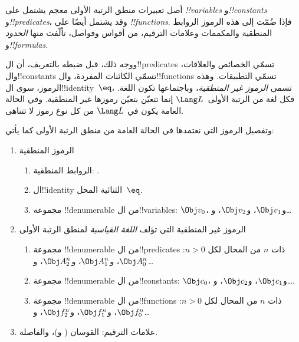 \documentclass[../../../include/open-logic-section]{subfiles}
\begin{document}



أصل تعبيرات منطق الرتبة الأولى معجم يشتمل على
\emph{!!{variable}s} و\emph{!!{constant}s} و\emph{!!{predicate}s}،
وقد يشتمل أيضًا على \emph{!!{function}s}. فإذا ضُمّت إلى هذه الرموز
الروابط المنطقية والمكممات وعلامات الترقيم، من أقواس وفواصل، تألّفت
منها \emph{الحدود} و\emph{!!{formula}s}.

\begin{explain}
ووجه ذلك، قبل ضبطه بالتعريف، أن ال!!{predicate}s تسمّي الخصائص
والعلاقات، وال!!{constant}s تسمّي الكائنات المفردة، وال!!{function}s
تسمّي التطبيقات. وهذه الرموز، سوى ال!!{identity}~$\eq$، تسمى
\emph{الرموز غير المنطقية}، وباجتماعها تكون اللغة. فكل لغة من
الرتبة الأولى~$\Lang L$ إنما تتعيّن بتعيّن رموزها غير المنطقية.
وفي الحالة العامة يكون في $\Lang L$ من كل نوع رموز لا تتناهى.
\end{explain}

وتفصيل الرموز التي نعتمدها في الحالة العامة من منطق الرتبة الأولى كما يأتي:

\begin{enumerate}
\item الرموز المنطقية
\begin{enumerate}
\item الروابط المنطقية:
  \startycommalist
  .
\item ال!!{identity} الثنائية المحل~$\eq$.
\item مجموعة !!{denumerable} من ال!!{variable}s: $\Obj v_0$، و$\Obj v_1$، و$\Obj
  v_2$، و\dots
\end{enumerate}
\item الرموز غير المنطقية التي تؤلف \emph{اللغة القياسية} لمنطق
  الرتبة الأولى
\begin{enumerate}
\item مجموعة !!{denumerable} من ال!!{predicate}s ذات $n$ من المحال لكل
  $n>0$: $\Obj A^n_0$، و$\Obj A^n_1$، و$\Obj A^n_2$، و\dots
\item مجموعة !!{denumerable} من ال!!{constant}s: $\Obj c_0$، و$\Obj c_1$، و$\Obj
  c_2$، و\dots.
\item مجموعة !!{denumerable} من ال!!{function}s ذات $n$ من المحال لكل
  $n>0$: $\Obj f^n_0$، و$\Obj f^n_1$، و$\Obj f^n_2$، و\dots
\end{enumerate}
\item علامات الترقيم: القوسان ( و)، والفاصلة.
\end{enumerate}
\end{document}
